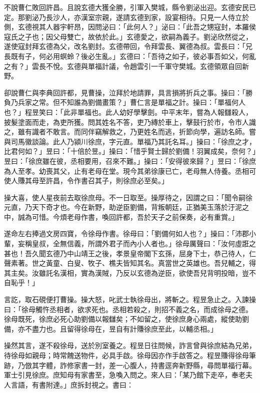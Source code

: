 不說曹仁敗回許昌。且說玄德大獲全勝，引軍入樊城，縣令劉泌出迎。玄德安民已定。那劉泌乃長沙人，亦漢室宗親，遂請玄德到家，設宴相待。只見一人侍立於側，玄德視其人器宇軒昂，因問泌曰：「此何人？」泌曰：「此吾之甥寇封，本羅侯寇氏之子也；因父母雙亡，故依於此。」玄德愛之，欲嗣為義子。劉泌欣然從之，遂使寇封拜玄德為父，改名劉封。玄德帶回，令拜雲長、翼德為叔。雲長曰：「兄長既有子，何必用螟蛉？後必生亂。」玄德曰：「吾待之如子，彼必事吾如父，何亂之有？」雲長不悅。玄德與單福計議，令趙雲引一千軍守樊城。玄德領眾自回新野。

卻說曹仁與李典回許都，見曹操，泣拜於地請罪，具言損將折兵之事。操曰：「勝負乃兵家之常。但不知誰為劉備畫策？」曹仁言是單福之計。操曰：「單福何人也？」程昱笑曰：「此非單福也。此人幼好學擊劍。中平末年，嘗為人報讎殺人，披髮塗面而走，為吏所獲。問其姓名不答，吏乃縳於車上，擊鼓行於市，令市人識之，雖有識者不敢言。而同伴竊解救之，乃更姓名而逃，折節向學，遍訪名師。嘗與司馬徽談論。此人乃潁川徐庶，字元直。單福乃其託名耳。」操曰：「徐庶之才，比君何如？」昱曰：「十倍於昱。」操曰：「惜乎賢士歸於劉備！羽翼成矣，奈何？」昱曰：「徐庶雖在彼，丞相要用，召來不難。」操曰：「安得彼來歸？」昱曰：「徐庶為人至孝。幼喪其父，止有老母在堂。現今其弟徐康已亡，老母無人侍養。丞相可使人賺其母至許昌，令作書召其子，則徐庶必至矣。」

操大喜，使人星夜前去取徐庶母。不一日取至。操厚待之，因謂之曰：「聞令嗣徐元直，乃天下奇才也。今在新野，助逆臣劉備，背叛朝廷，正猶美玉落於汙泥之中，誠為可惜。今煩老母作書，喚回許都，吾於天子之前保奏，必有重賞。」

遂命左右捧過文房四寶，令徐母作書。徐母曰：「劉備何如人也？」操曰：「沛郡小輩，妄稱皇叔，全無信義，所謂外君子而內小人者也。」徐母厲聲曰：「汝何虛誑之甚也！吾久聞玄德乃中山靖王之後，孝景皇帝閣下玄孫，屈身下士，恭己待人，仁聲素著。世之黃童、白叟、牧子、樵夫皆知其名。真當世之英雄也。吾兒輔之，得其主矣。汝雖託名漢相，實為漢賊，乃反以玄德為逆臣，欲使吾兒背明投暗，豈不自恥乎！」

言訖，取石硯便打曹操。操大怒，叱武士執徐母出，將斬之。程昱急止之。入諫操曰：「徐母觸忤丞相者，欲求死也。丞相若殺之，則招不義之名，而成徐母之德。徐母既死，徐庶必死心助劉備以報讎矣；不如留之，使徐庶身心兩處，縱使助劉備，亦不盡力也。且留得徐母在，昱自有計賺徐庶至此，以輔丞相。」

操然其言，遂不殺徐母，送於別室養之。程昱日往問候，詐言曾與徐庶結為兄弟，待徐母如親母；時常餽送物件，必具手啟。徐母因亦作手啟答之。程昱賺得徐母筆跡，乃倣其字體，詐修家書一封，差一心腹人，持書逕奔新野縣，尋問單福行幕。軍士引見徐庶。庶知母有家書至，急喚入問之。來人曰：「某乃館下走卒，奉老夫人言語，有書附達。」庶拆封視之。書曰：

